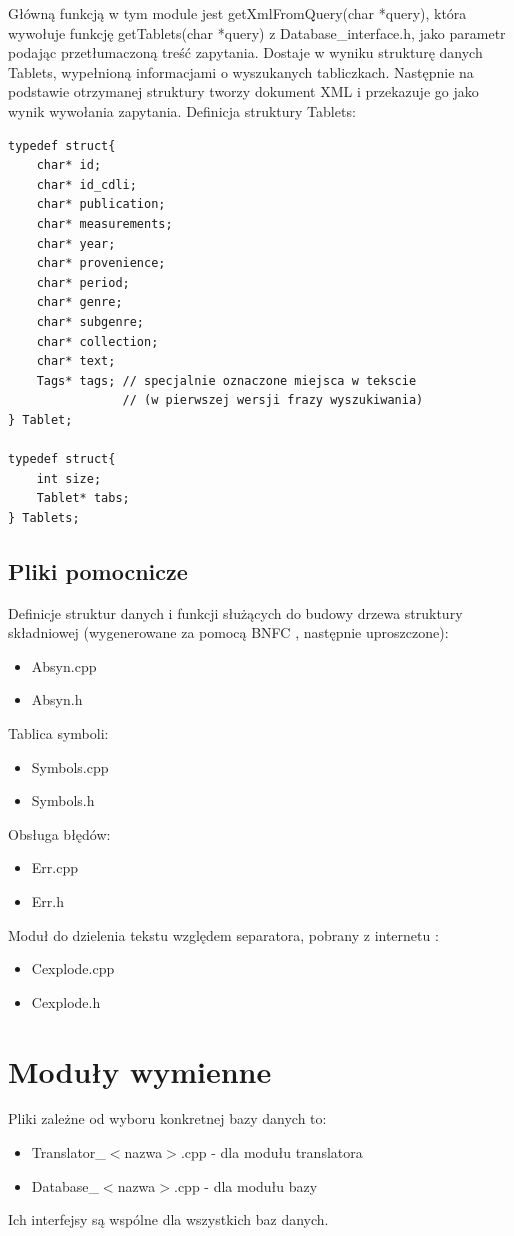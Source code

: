 Główną funkcją w tym module jest getXmlFromQuery(char *query), która
wywołuje funkcję getTablets(char *query) z Database\_interface.h, jako parametr podając przetłumaczoną treść zapytania. 
Dostaje w wyniku strukturę danych Tablets, wypełnioną informacjami o wyszukanych tabliczkach.
Następnie na podstawie otrzymanej struktury tworzy dokument XML i przekazuje go jako wynik wywołania zapytania.
\newline
Definicja struktury Tablets:
\begin{verbatim}
typedef struct{    
    char* id;
    char* id_cdli;
    char* publication;
    char* measurements;
    char* year;
    char* provenience;
    char* period;
    char* genre;
    char* subgenre;
    char* collection;
    char* text;
    Tags* tags; // specjalnie oznaczone miejsca w tekscie
                // (w pierwszej wersji frazy wyszukiwania)
} Tablet;

typedef struct{
    int size;
    Tablet* tabs;
} Tablets;
\end{verbatim}



\section{Pliki pomocnicze}
Definicje struktur danych i funkcji służących do budowy drzewa struktury składniowej (wygenerowane za pomocą BNFC \cite{bnfc}, następnie uproszczone):
\begin{itemize}
 \item Absyn.cpp
 \item Absyn.h
\end{itemize}
Tablica symboli:
\begin{itemize}
 \item Symbols.cpp
\item Symbols.h
\end{itemize}
Obsługa błędów:
\begin{itemize}
 \item Err.cpp
\item Err.h
\end{itemize}
Moduł do dzielenia tekstu względem separatora, pobrany z internetu \cite{cexplode}:
\begin{itemize}
 \item Cexplode.cpp
 \item Cexplode.h
\end{itemize}


\chapter{Moduły wymienne}
Pliki zależne od wyboru konkretnej bazy danych to:
\begin{itemize}
 \item Translator\_$<$nazwa$>$.cpp - dla modułu translatora
\item Database\_$<$nazwa$>$.cpp - dla modułu bazy
\end{itemize}
Ich interfejsy są wspólne dla wszystkich baz danych.
